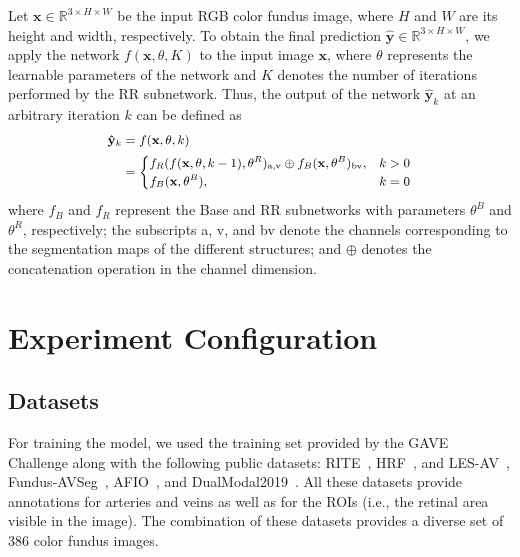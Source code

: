 \documentclass{article}
\begin{document}
Let $\mathbf{x} \in \mathbb{R}^{3 \times H \times W}$ be the input RGB color fundus image, where $H$ and $W$ are its height and width, respectively.
To obtain the final prediction $\mathbf{\hat{y}} \in \mathbb{R}^{3 \times H \times W}$, we apply the network $f(\mathbf{x}, \theta, K)$ to the input image $\mathbf{x}$, where $\theta$ represents the learnable parameters of the network and $K$ denotes the number of iterations performed by the \gls{RR} subnetwork.
Thus, the output of the network $\mathbf{\hat{y}}_k$ at an arbitrary iteration $k$ can be defined as
%
\begin{equation}\label{eq:network}
    \small
    \begin{aligned}
        \mathbf{\hat{y}}_k &= f(\mathbf{x}, \theta, k) \\
        &= \begin{cases}
            f_R(f(\mathbf{x}, \theta, k-1), \theta^R)_\text{a,v} \oplus f_B(\mathbf{x}, \theta^B)_\text{bv}, & k > 0 \\
            f_B(\mathbf{x}, \theta^B), & k = 0
        \end{cases}
    \end{aligned}
\end{equation}
%
where
$f_B$ and $f_R$ represent the Base and \gls{RR} subnetworks with parameters $\theta^B$ and $\theta^R$, respectively;
the subscripts a, v, and bv denote the channels corresponding to the segmentation maps of the different structures;
and $\oplus$ denotes the concatenation operation in the channel dimension.



\section{Experiment Configuration}


\subsection{Datasets}

For training the model, we used the training set provided by the \gls{GAVE} Challenge along with the following public datasets: RITE~\cite{hu2013rite,staal2004ridge}, HRF~\cite{budai2013robust,chen2022twgan}, and LES-AV~\cite{orlando2018lesav}, Fundus-AVSeg~\cite{deng2025fundusavseg}, AFIO~\cite{afio2020}, and DualModal2019~\cite{dualmodal2019}.
All these datasets provide annotations for arteries and veins as well as for the \glspl{ROI} (i.e., the retinal area visible in the image).
The combination of these datasets provides a diverse set of 386 color fundus images.
\end{document}
